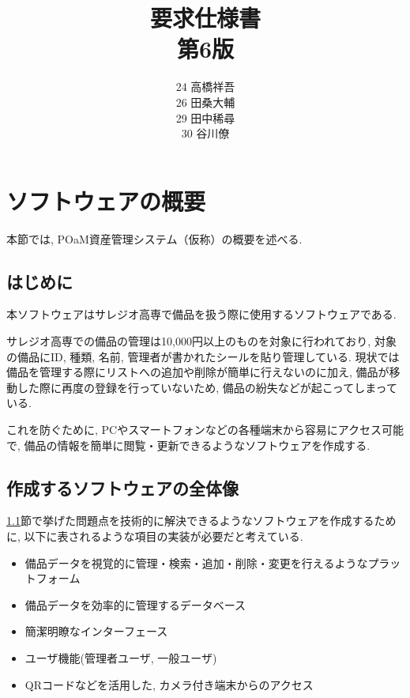 \documentclass[11ptm]{jsarticle}
\title{{\Huge 要求仕様書}\\第6版}
\author{24 高橋祥吾\\26 田桑大輔\\29 田中稀尋\\30 谷川僚}
\date{}
\begin{document}
\setcounter{page}{0}

\maketitle
\thispagestyle{empty}

\clearpage

\setcounter{page}{0}
\thispagestyle{empty}

\tableofcontents
\clearpage


\section{ソフトウェアの概要}
\label{sec:ソフトウェアの概要}
本節では, POaM資産管理システム（仮称）の概要を述べる.

\subsection{はじめに}
\label{subsec:はじめに}
本ソフトウェアはサレジオ高専で備品を扱う際に使用するソフトウェアである. \par
サレジオ高専での備品の管理は10,000円以上のものを対象に行われており, 対象の備品にID, 種類, 名前, 管理者が書かれたシールを貼り管理している. 現状では備品を管理する際にリストへの追加や削除が簡単に行えないのに加え, 備品が移動した際に再度の登録を行っていないため, 備品の紛失などが起こってしまっている.\par
これを防ぐために, PCやスマートフォンなどの各種端末から容易にアクセス可能で, 備品の情報を簡単に閲覧・更新できるようなソフトウェアを作成する.

\subsection{作成するソフトウェアの全体像}
\label{subsec:作成するソフトウェアの全体像}
\ref{subsec:はじめに}節で挙げた問題点を技術的に解決できるようなソフトウェアを作成するために, 以下に表されるような項目の実装が必要だと考えている.
\begin{itemize}
  \item 備品データを視覚的に管理・検索・追加・削除・変更を行えるようなプラットフォーム
  \item 備品データを効率的に管理するデータベース
  \item 簡潔明瞭なインターフェース
  \item ユーザ機能(管理者ユーザ, 一般ユーザ)
  \item QRコードなどを活用した, カメラ付き端末からのアクセス
\end{itemize}
\end{document}
